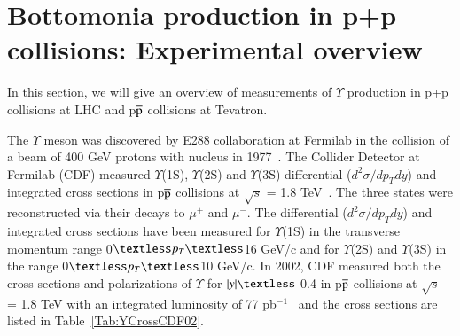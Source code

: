 \section{Bottomonia production in p+p collisions: Experimental overview}


 In this section, we will give an overview of measurements of $\Upsilon$
production in p+p collisions at LHC and p$\overline{\rm p}$ collisions at Tevatron. 


The $\Upsilon$ meson was discovered by E288 collaboration at Fermilab in the collision of
a beam of 400 GeV protons with nucleus in 1977~\cite{PhysRevLett.39.252}.
The Collider Detector at Fermilab (CDF) measured $\Upsilon$(1S), $\Upsilon$(2S) and $\Upsilon$(3S) 
differential ($d^{2}\sigma/dp_{T}dy$) and integrated cross sections in p$\overline{\rm p}$
collisions at
$\surd s$ = 1.8 TeV~\cite{CDF:1995gwi}. The three states were reconstructed via their decays 
to $\mu^{+}$ and $\mu^{-}$. The differential ($d^{2}\sigma/dp_{T}dy$) and integrated
cross sections have been measured for  $\Upsilon$(1S) in the transverse momentum range
0$\textless p_{T} \textless$16 GeV/c and for $\Upsilon$(2S) and $\Upsilon$(3S)
in the range 0$\textless p_{T}\textless$10 GeV/c.
  In 2002, CDF measured both the cross sections and polarizations of $\Upsilon$
for $|y|\textless$ 0.4 in p$\overline{\rm p}$ collisions at $\surd s$ = 1.8 TeV with
an integrated luminosity of 77 pb$^{-1}$~\cite{CDF:2001fdy} and the cross sections are
listed in Table~\ref{Tab:YCrossCDF02}.



